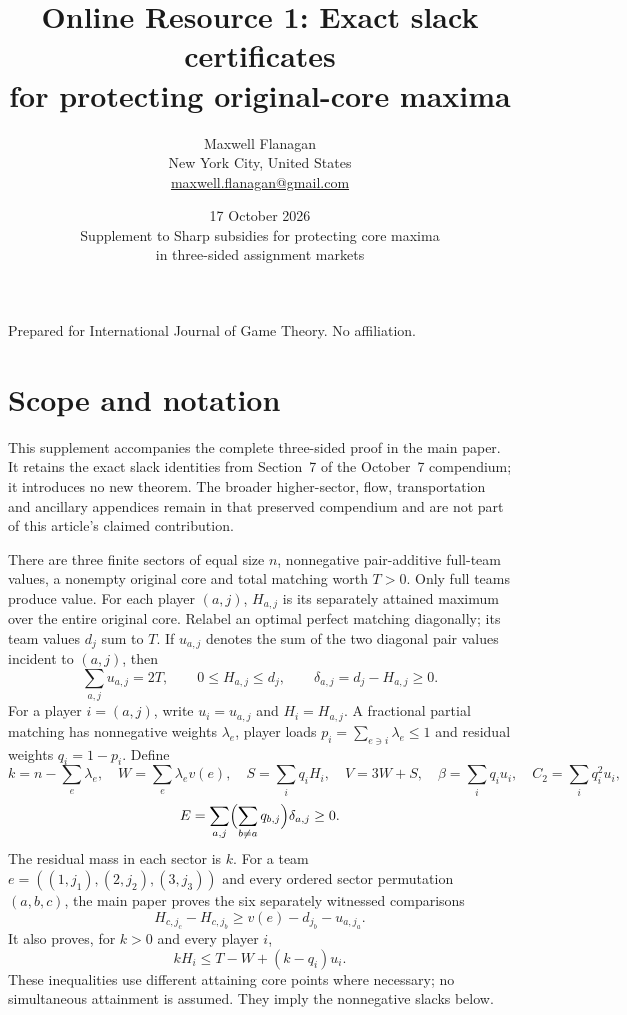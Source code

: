 \documentclass[11pt]{article}
\title{Online Resource 1: Exact slack certificates\\for protecting original-core maxima}
\author{Maxwell Flanagan\\\small New York City, United States\\\small\href{mailto:maxwell.flanagan@gmail.com}{maxwell.flanagan@gmail.com}}
\date{17 October 2026\\[2pt]\small Supplement to Sharp subsidies for protecting core maxima\\in three-sided assignment markets}
\theoremstyle{remark}
\begin{document}
\maketitle
\noindent Prepared for International Journal of Game Theory. No affiliation.

\section{Scope and notation}
This supplement accompanies the complete three-sided proof in the main paper.
It retains the exact slack identities from Section~7 of the October~7
compendium; it introduces no new theorem. The broader higher-sector, flow,
transportation and ancillary appendices remain in that preserved compendium
and are not part of this article's claimed contribution.

There are three finite sectors of equal size $n$, nonnegative pair-additive full-team
values, a nonempty original core and total matching worth $T>0$. Only full
teams produce value. For each player $(a,j)$, $H_{a,j}$ is its separately
attained maximum over the entire original core. Relabel an optimal perfect
matching diagonally; its team values $d_j$ sum to $T$. If $u_{a,j}$ denotes
the sum of the two diagonal pair values incident to $(a,j)$, then
\[
\sum_{a,j}u_{a,j}=2T,\qquad 0\le H_{a,j}\le d_j,
\qquad\delta_{a,j}=d_j-H_{a,j}\ge0.
\]
For a player $i=(a,j)$, write $u_i=u_{a,j}$ and $H_i=H_{a,j}$.
A fractional partial matching has nonnegative weights $\lambda_e$, player
loads $p_i=\sum_{e\ni i}\lambda_e\le1$ and residual weights $q_i=1-p_i$.
Define
\[
 k=n-\sum_e\lambda_e,\quad W=\sum_e\lambda_ev(e),\quad
 S=\sum_iq_iH_i,\quad V=3W+S,\quad
 \beta=\sum_iq_iu_i,\quad C_2=\sum_iq_i^2u_i,
\]
\[
 E=\sum_{a,j}\Bigl(\sum_{b\ne a}q_{b,j}\Bigr)\delta_{a,j}\ge0.
\]
The residual mass in each sector is $k$. For a team
$e=((1,j_1),(2,j_2),(3,j_3))$ and every ordered sector permutation $(a,b,c)$,
the main paper proves the six separately witnessed comparisons
\begin{equation}\label{eq:comparison}
 H_{c,j_c}-H_{c,j_b}\ge v(e)-d_{j_b}-u_{a,j_a}.
\end{equation}
It also proves, for $k>0$ and every player $i$,
\[
 kH_i\le T-W+(k-q_i)u_i.
\]
These inequalities use different attaining core points where necessary;
no simultaneous attainment is assumed. They imply the nonnegative slacks below.
\end{document}
